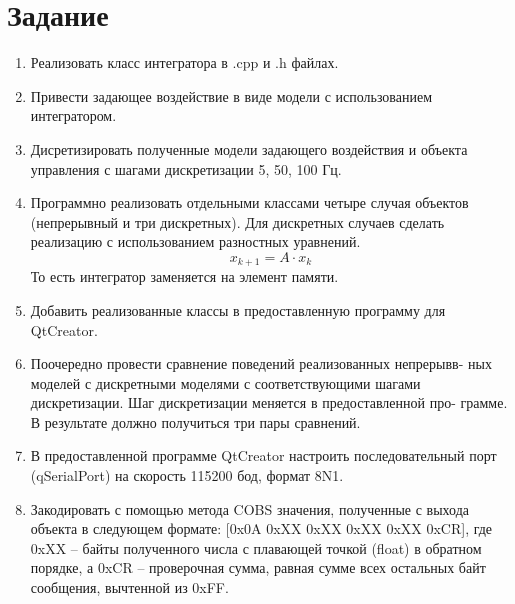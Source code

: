 \documentclass[14pt,a4paper]{extreport}
\begin{document}


\newpage
\tableofcontents

\chapter*{Задание}

\begin{enumerate}
\item 
Реализовать класс интегратора в .cpp и .h файлах.
    
\item 
Привести задающее воздействие в виде модели с использованием интегратором.
    
\item 
Дисретизировать полученные модели задающего воздействия 
и объекта управления с шагами дискретизации 5, 50, 100 Гц.

\item
Программно реализовать отдельными классами четыре случая объектов 
(непрерывный и три дискретных). Для дискретных случаев сделать 
реализацию с использованием разностных уравнений.
\begin{equation} 
    x_{k+1} = A \cdot x_k
\end{equation}
То есть интегратор заменяется на элемент памяти.

\item 
Добавить реализованные классы в предоставленную программу для \\ QtCreator.

\item
Поочередно провести сравнение поведений реализованных непрерывв-
ных моделей с дискретными моделями с соответствующими шагами
дискретизации. Шаг дискретизации меняется в предоставленной про-
грамме. В результате должно получиться три пары сравнений.

\item 
В предоставленной программе QtCreator настроить последовательный
порт (qSerialPort) на скорость 115200 бод, формат 8N1.

\item 
Закодировать с помощью метода COBS значения, полученные с выхода
объекта в следующем формате:
{[0x0A 0xXX 0xXX 0xXX 0xXX 0xCR]}, где 0xXX – байты полученного 
числа с плавающей точкой (float) в
обратном порядке, а 0xCR – проверочная сумма, равная сумме всех
остальных байт сообщения, вычтенной из 0xFF.

\end{enumerate}
\end{document}
